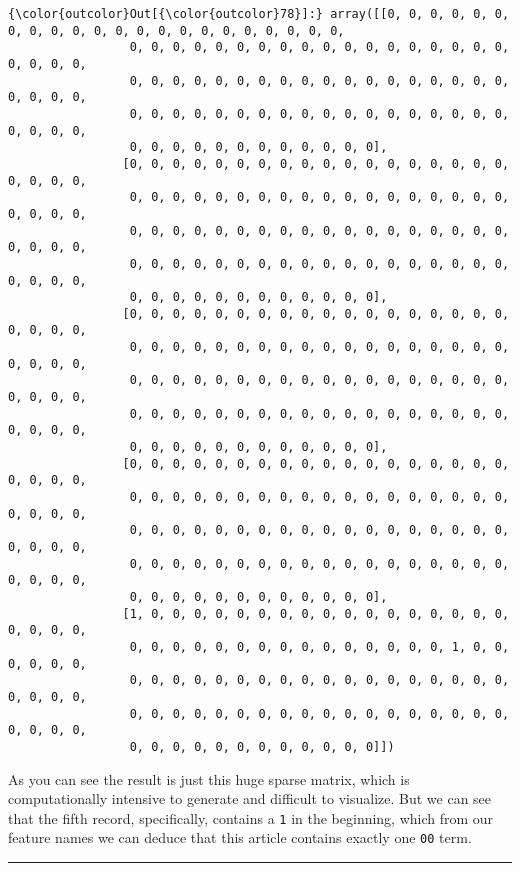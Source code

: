 \documentclass[11pt]{article}
\begin{document}
\begin{Verbatim}[commandchars=\\\{\}]
{\color{outcolor}Out[{\color{outcolor}78}]:} array([[0, 0, 0, 0, 0, 0, 0, 0, 0, 0, 0, 0, 0, 0, 0, 0, 0, 0, 0, 0, 0, 0,
                 0, 0, 0, 0, 0, 0, 0, 0, 0, 0, 0, 0, 0, 0, 0, 0, 0, 0, 0, 0, 0, 0,
                 0, 0, 0, 0, 0, 0, 0, 0, 0, 0, 0, 0, 0, 0, 0, 0, 0, 0, 0, 0, 0, 0,
                 0, 0, 0, 0, 0, 0, 0, 0, 0, 0, 0, 0, 0, 0, 0, 0, 0, 0, 0, 0, 0, 0,
                 0, 0, 0, 0, 0, 0, 0, 0, 0, 0, 0, 0],
                [0, 0, 0, 0, 0, 0, 0, 0, 0, 0, 0, 0, 0, 0, 0, 0, 0, 0, 0, 0, 0, 0,
                 0, 0, 0, 0, 0, 0, 0, 0, 0, 0, 0, 0, 0, 0, 0, 0, 0, 0, 0, 0, 0, 0,
                 0, 0, 0, 0, 0, 0, 0, 0, 0, 0, 0, 0, 0, 0, 0, 0, 0, 0, 0, 0, 0, 0,
                 0, 0, 0, 0, 0, 0, 0, 0, 0, 0, 0, 0, 0, 0, 0, 0, 0, 0, 0, 0, 0, 0,
                 0, 0, 0, 0, 0, 0, 0, 0, 0, 0, 0, 0],
                [0, 0, 0, 0, 0, 0, 0, 0, 0, 0, 0, 0, 0, 0, 0, 0, 0, 0, 0, 0, 0, 0,
                 0, 0, 0, 0, 0, 0, 0, 0, 0, 0, 0, 0, 0, 0, 0, 0, 0, 0, 0, 0, 0, 0,
                 0, 0, 0, 0, 0, 0, 0, 0, 0, 0, 0, 0, 0, 0, 0, 0, 0, 0, 0, 0, 0, 0,
                 0, 0, 0, 0, 0, 0, 0, 0, 0, 0, 0, 0, 0, 0, 0, 0, 0, 0, 0, 0, 0, 0,
                 0, 0, 0, 0, 0, 0, 0, 0, 0, 0, 0, 0],
                [0, 0, 0, 0, 0, 0, 0, 0, 0, 0, 0, 0, 0, 0, 0, 0, 0, 0, 0, 0, 0, 0,
                 0, 0, 0, 0, 0, 0, 0, 0, 0, 0, 0, 0, 0, 0, 0, 0, 0, 0, 0, 0, 0, 0,
                 0, 0, 0, 0, 0, 0, 0, 0, 0, 0, 0, 0, 0, 0, 0, 0, 0, 0, 0, 0, 0, 0,
                 0, 0, 0, 0, 0, 0, 0, 0, 0, 0, 0, 0, 0, 0, 0, 0, 0, 0, 0, 0, 0, 0,
                 0, 0, 0, 0, 0, 0, 0, 0, 0, 0, 0, 0],
                [1, 0, 0, 0, 0, 0, 0, 0, 0, 0, 0, 0, 0, 0, 0, 0, 0, 0, 0, 0, 0, 0,
                 0, 0, 0, 0, 0, 0, 0, 0, 0, 0, 0, 0, 0, 0, 0, 1, 0, 0, 0, 0, 0, 0,
                 0, 0, 0, 0, 0, 0, 0, 0, 0, 0, 0, 0, 0, 0, 0, 0, 0, 0, 0, 0, 0, 0,
                 0, 0, 0, 0, 0, 0, 0, 0, 0, 0, 0, 0, 0, 0, 0, 0, 0, 0, 0, 0, 0, 0,
                 0, 0, 0, 0, 0, 0, 0, 0, 0, 0, 0, 0]])
\end{Verbatim}
            
    As you can see the result is just this huge sparse matrix, which is
computationally intensive to generate and difficult to visualize. But we
can see that the fifth record, specifically, contains a \texttt{1} in
the beginning, which from our feature names we can deduce that this
article contains exactly one \texttt{00} term.

    \begin{center}\rule{0.5\linewidth}{\linethickness}\end{center}
\end{document}
